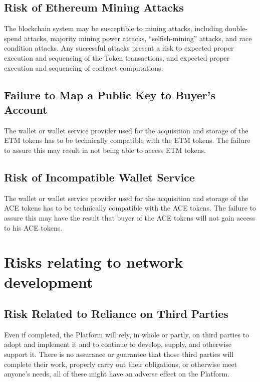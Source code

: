 \documentclass[12pt]{report}
\begin{document}
\subsection*{Risk of Ethereum Mining Attacks}
The blockchain system may be susceptible to mining attacks, including double-spend attacks, majority mining power attacks, “selfish-mining” attacks, and race condition attacks. Any successful attacks present a risk to expected proper execution and sequencing of the Token transactions, and expected proper execution and sequencing of contract computations.

\subsection*{Failure to Map a Public Key to Buyer’s Account}
The wallet or wallet service provider used for the acquisition and storage of the ETM tokens has to be technically compatible with the ETM tokens. The failure to assure this may result in not being able to access ETM tokens.

\subsection*{Risk of Incompatible Wallet Service}
The wallet or wallet service provider used for the acquisition and storage of the ACE tokens has to be technically compatible with the ACE tokens. The failure to assure this may have the result that buyer of the ACE tokens will not gain access to his ACE tokens.

\section{Risks relating to network development}
\subsection*{Risk Related to Reliance on Third Parties}
Even if completed, the Platform will rely, in whole or partly, on third parties to adopt and implement it and to continue to develop, supply, and otherwise support it. There is no assurance or guarantee that those third parties will complete their work, properly carry out their obligations, or otherwise meet anyone’s needs, all of these might have an adverse effect on the Platform.
\end{document}
